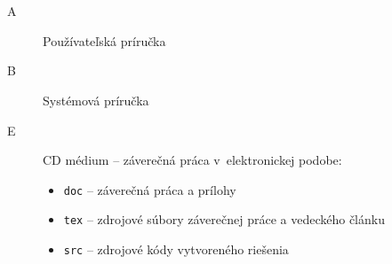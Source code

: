 
\chapter*{\appendixlistname}

\begin{description}

   \item[\appendixname{} A] Používateľská príručka
   \item[\appendixname{} B] Systémová príručka
   \item[\appendixname{} E] CD médium -- záverečná práca v~elektronickej podobe:
   \begin{itemize}
    \item \texttt{doc} -- záverečná práca a prílohy
    \item \texttt{tex} -- zdrojové súbory záverečnej práce a vedeckého článku
    \item \texttt{src} -- zdrojové kódy vytvoreného riešenia
   \end{itemize}


\end{description}

